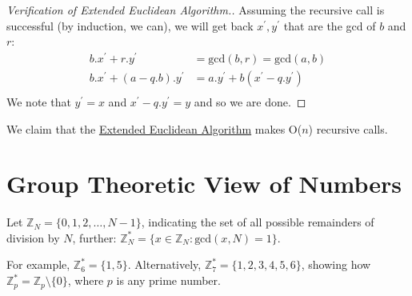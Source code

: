 \begin{proof}[Verification of Extended Euclidean Algorithm.]
	Assuming the recursive call is successful (by induction, we can), we will get back
	\(x^{\prime}, y^{\prime} \) that are the gcd of \(b\) and \(r\):   
	\[
		\begin{split}
			b . x^{\prime}  + r . y^{\prime} &= \text{gcd}(b, r) = \text{gcd}(a, b) \\
			b . x^{\prime} + (a - q . b) . y^{\prime} &= a . y^{\prime} + b (x^{\prime} - q . y^{\prime} ) \\
		\end{split}
	\]
	We note that \(y^{\prime} = x\) and \(x^{\prime} - q. y^{\prime} = y\) and so we are done.  
\end{proof}

We claim that the \hyperref[eea]{Extended Euclidean Algorithm} makes O(\(n\)) recursive calls.

\section{Group Theoretic View of Numbers}

\begin{definition}
	Let \(\mathbb{Z}_N = \{0, 1, 2, \ldots, N - 1 \}\), indicating the set of all possible 
	remainders of division by \(N\), further: \(\mathbb{Z}_N^* = \{ x \in \mathbb{Z}_N \colon \text{gcd}(x, N) = 1 \}\).
\end{definition}

\begin{remark}
	For example, \(\mathbb{Z}_6^* = \{1, 5\}\). Alternatively, \(\mathbb{Z}_7^* = \{
	1, 2, 3, 4, 5, 6 \}\), showing how \(\mathbb{Z}_p^* = \mathbb{Z}_p \setminus \{0\}\),
	where \(p\) is any prime number.   
\end{remark}
